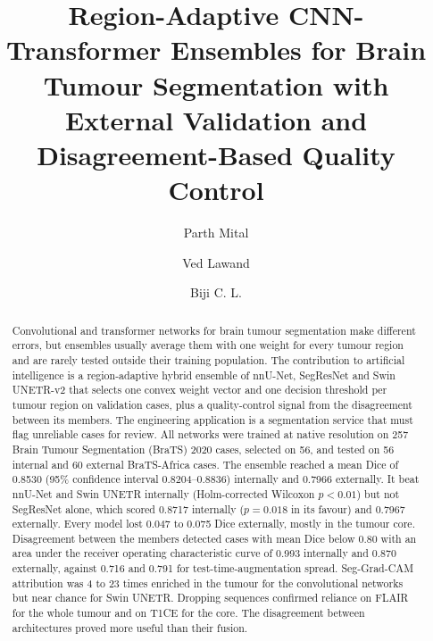 \documentclass[a4paper,fleqn]{cas-sc}
\begin{document}

\title[mode=title]{Region-Adaptive CNN-Transformer Ensembles for Brain Tumour Segmentation with External Validation and Disagreement-Based Quality Control}

\ifdefined\Anonymised
{}
\else
{}

\author[1]{Parth Mital}
\cormark[1]
\author[1]{Ved Lawand}
\author[1]{Biji C. L.}


\fi

\begin{abstract}
Convolutional and transformer networks for brain tumour segmentation make different errors, but ensembles usually average them with one weight for every tumour region and are rarely tested outside their training population. The contribution to artificial intelligence is a region-adaptive hybrid ensemble of nnU-Net, SegResNet and Swin UNETR-v2 that selects one convex weight vector and one decision threshold per tumour region on validation cases, plus a quality-control signal from the disagreement between its members. The engineering application is a segmentation service that must flag unreliable cases for review. All networks were trained at native resolution on 257 Brain Tumour Segmentation (BraTS) 2020 cases, selected on 56, and tested on 56 internal and 60 external BraTS-Africa cases. The ensemble reached a mean Dice of 0.8530 (95\% confidence interval 0.8204--0.8836) internally and 0.7966 externally. It beat nnU-Net and Swin UNETR internally (Holm-corrected Wilcoxon $p<0.01$) but not SegResNet alone, which scored 0.8717 internally ($p=0.018$ in its favour) and 0.7967 externally. Every model lost 0.047 to 0.075 Dice externally, mostly in the tumour core. Disagreement between the members detected cases with mean Dice below 0.80 with an area under the receiver operating characteristic curve of 0.993 internally and 0.870 externally, against 0.716 and 0.791 for test-time-augmentation spread. Seg-Grad-CAM attribution was 4 to 23 times enriched in the tumour for the convolutional networks but near chance for Swin UNETR. Dropping sequences confirmed reliance on FLAIR for the whole tumour and on T1CE for the core. The disagreement between architectures proved more useful than their fusion.
\end{abstract}
\end{document}
